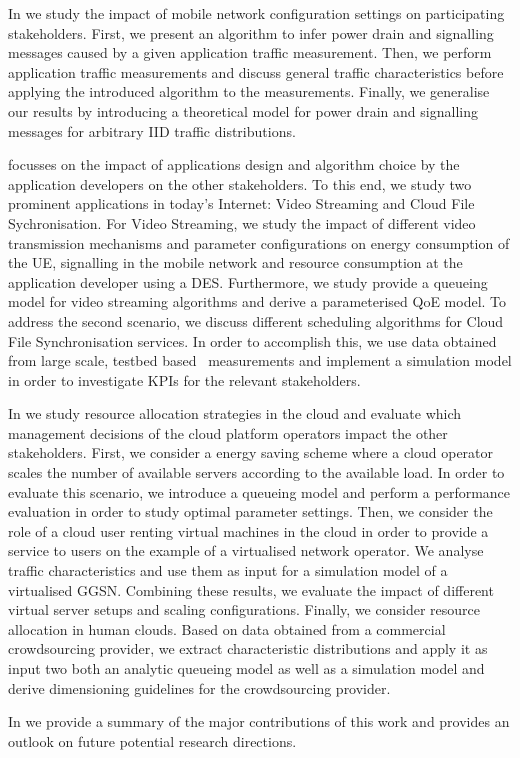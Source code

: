In  we study the impact of mobile network configuration settings on participating stakeholders.
First, we present an algorithm to infer power drain and signalling messages caused by a given application traffic measurement.
Then, we perform application traffic measurements and discuss general traffic characteristics before applying the introduced algorithm to the measurements.
Finally, we generalise our results by introducing a theoretical model for power drain and signalling messages for arbitrary \gls{IID} traffic distributions.

 focusses on the impact of applications design and algorithm choice by the application developers on the other stakeholders.
To this end, we study two prominent applications in today's Internet: Video Streaming and Cloud File Sychronisation.
For Video Streaming, we study the impact of different video transmission mechanisms and parameter configurations on energy consumption of the \gls{UE}, signalling in the mobile network and resource consumption at the application developer using a \gls{DES}.
Furthermore, we study provide a queueing model for video streaming algorithms and derive a parameterised \gls{QoE} model.
To address the second scenario, we discuss different scheduling algorithms for Cloud File Synchronisation services.
In order to accomplish this, we use data obtained from large scale, testbed based~\cite{Chun2003} measurements and implement a simulation model in order to investigate \glspl{KPI} for the relevant stakeholders.  

In  we study resource allocation strategies in the cloud and evaluate which management decisions of the cloud platform operators impact the other stakeholders.
First, we consider a energy saving scheme where a cloud operator scales the number of available servers according to the available load.
In order to evaluate this scenario, we introduce a queueing model and perform a performance evaluation in order to study optimal parameter settings.
Then, we consider the role of a cloud user renting virtual machines in the cloud in order to provide a service to users on the example of a virtualised network operator.
We analyse traffic characteristics and use them as input for a simulation model of a virtualised \gls{GGSN}.
Combining these results, we evaluate the impact of different virtual server setups and scaling configurations.
Finally, we consider resource allocation in human clouds.
Based on data obtained from a commercial crowdsourcing provider, we extract characteristic distributions and apply it as input two both an analytic queueing model as well as a simulation model and derive dimensioning guidelines for the crowdsourcing provider.

In  we provide a summary of the major contributions of this work and provides an outlook on future potential research directions.